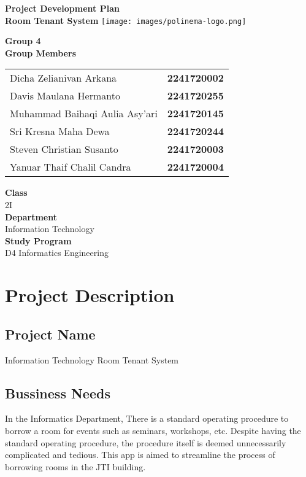 \documentclass[12pt,titlepage,a4paper]{report}
\newcommand{\vSubject}{Project Development Plan}
\newcommand{\vSubtitle}{Room Tenant System}
\newcommand{\vClass}{2I}
\newcommand{\vGroup}{Group 4}
\newcommand{\vDepartment}{Information Technology}
\newcommand{\vStudyProgram}{D4 Informatics Engineering}
\begin{document}
\begin{titlepage}
    \centering
    \vfill
    {\bfseries\LARGE
        \vSubject\\
        \vskip0.25cm
        \vSubtitle
    }
    \vfill
    \texttt{[image: images/polinema-logo.png]}
    \vfill
    {
        \textbf{\vGroup} \\
        \vspace{0.5cm}
        \textbf{Group Members}\\
        \vspace{0.5cm}
        \begin{tabular}{l l}
            Dicha Zelianivan Arkana         & \textbf{2241720002} \\
            Davis Maulana Hermanto          & \textbf{2241720255} \\
            Muhammad Baihaqi Aulia Asy'ari  & \textbf{2241720145} \\
            Sri Kresna Maha Dewa            & \textbf{2241720244} \\
            Steven Christian Susanto        & \textbf{2241720003} \\
            Yanuar Thaif Chalil Candra      & \textbf{2241720004} \\            
        \end{tabular}
        \vskip0.5cm
        \textbf{Class}\\
        \vClass\\
        \vskip0.5cm
        \textbf{Department}\\
        \vDepartment\\
        \vskip0.5cm
        \textbf{Study Program}\\
        \vStudyProgram
    }
\end{titlepage}

\tableofcontents

\newpage

\chapter{Project Description}
    \section{Project Name}
    Information Technology Room Tenant System
    \section{Bussiness Needs}
    In the Informatics Department, There is a standard operating procedure to borrow a room for events such as seminars, workshops, etc. Despite having the standard operating procedure, the procedure itself is deemed unnecessarily complicated and tedious. This app is aimed to streamline the process of borrowing rooms in the JTI building.
\end{document}

